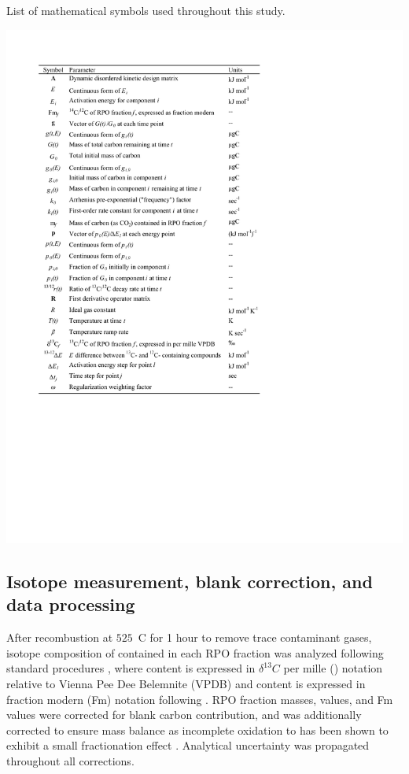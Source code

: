 \begin{table}[p]
	\caption[List of mathematical symbols used throughout this study]{List of mathematical symbols used throughout this study.}
	\centering
		\includegraphics{Thesis_Tables/Ch3Tab1}
	\label{Ch3Tab:1} 
\end{table}

\subsection{Isotope measurement, blank correction, and data processing}

After recombustion at $525$\textdegree\ C for 1 hour to remove trace contaminant gases, isotope composition of  contained in each RPO fraction was analyzed following standard procedures \citep{McNichol:1994ty,Pearson:1998vy}, where  content is expressed in $\delta^{13}C$ per mille (\textperthousand) notation relative to Vienna Pee Dee Belemnite (VPDB) and  content is expressed in fraction modern (Fm) notation following \citet{Stuiver:1977uh}. RPO fraction masses,  values, and Fm values were corrected for blank carbon contribution, and  was additionally corrected to ensure  mass balance as incomplete oxidation to  has been shown to exhibit a small fractionation effect \citep{Hemingway:2016rc}. Analytical uncertainty was propagated throughout all corrections.

